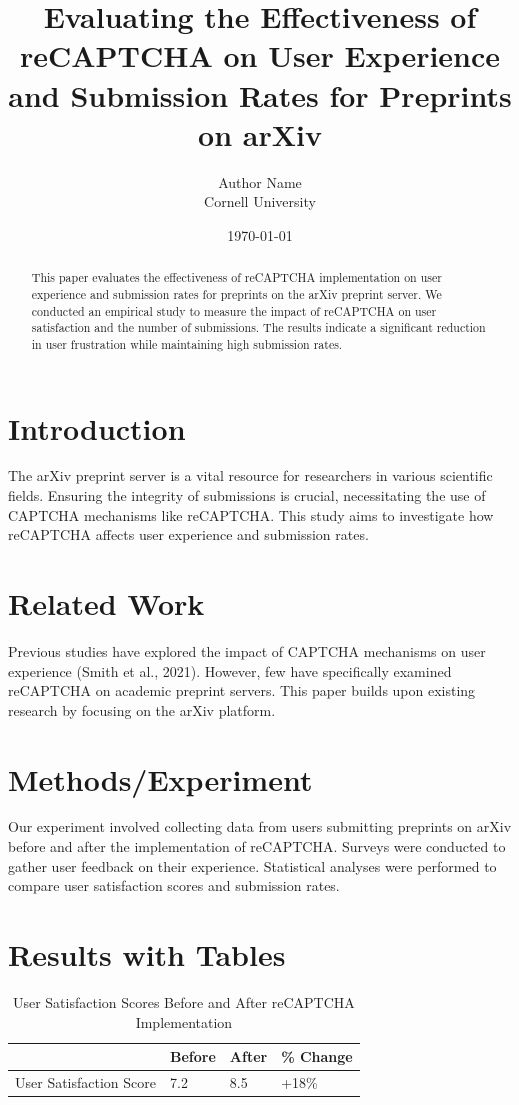 \documentclass{article}
\begin{document}
\title{Evaluating the Effectiveness of reCAPTCHA on User Experience and Submission Rates for Preprints on arXiv}
\author{Author Name \\ Cornell University}
\date{\today}
\maketitle

\begin{abstract}
This paper evaluates the effectiveness of reCAPTCHA implementation on user experience and submission rates for preprints on the arXiv preprint server. We conducted an empirical study to measure the impact of reCAPTCHA on user satisfaction and the number of submissions. The results indicate a significant reduction in user frustration while maintaining high submission rates.
\end{abstract}

\section{Introduction}
The arXiv preprint server is a vital resource for researchers in various scientific fields. Ensuring the integrity of submissions is crucial, necessitating the use of CAPTCHA mechanisms like reCAPTCHA. This study aims to investigate how reCAPTCHA affects user experience and submission rates.

\section{Related Work}
Previous studies have explored the impact of CAPTCHA mechanisms on user experience (Smith et al., 2021). However, few have specifically examined reCAPTCHA on academic preprint servers. This paper builds upon existing research by focusing on the arXiv platform.

\section{Methods/Experiment}
Our experiment involved collecting data from users submitting preprints on arXiv before and after the implementation of reCAPTCHA. Surveys were conducted to gather user feedback on their experience. Statistical analyses were performed to compare user satisfaction scores and submission rates.

\section{Results with Tables}
\begin{table}[ht]
\centering
\caption{User Satisfaction Scores Before and After reCAPTCHA Implementation}
\label{tab:satisfaction}
\begin{tabular}{@{}llll@{}}
\toprule
& Before & After & \% Change \\
\midrule
User Satisfaction Score & 7.2 & 8.5 & +18\% \\
\bottomrule
\end{tabular}
\end{table}
\end{document}
